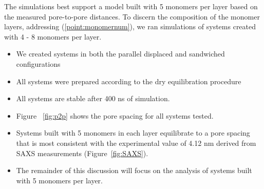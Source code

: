 \documentclass{article}
\begin{document}


  The simulations best support a model built with 5 monomers per layer based on 
  the measured pore-to-pore distances. To discern the composition of the monomer 
  layers, addressing (\ref{point:monomernum}), we ran simulations of systems created
  with 4 - 8 monomers per layer.  %
  \begin{itemize}
        \item We created systems in both the parallel displaced and sandwiched configurations
	\item All systems were prepared according to the dry equilibration procedure
        \item All systems are stable after 400 ns of simulation.  
        \item Figure ~\ref{fig:p2p} shows the pore spacing for all systems tested.
        \item Systems built with 5 monomers in each layer equilibrate to a pore spacing
        that is most consistent with the experimental value of 4.12 nm derived from
        SAXS measurements (Figure~\ref{fig:SAXS}).
        \item The remainder of this discussion will focus on the analysis of systems
        built with 5 monomers per layer.
  \end{itemize}
\end{document}
